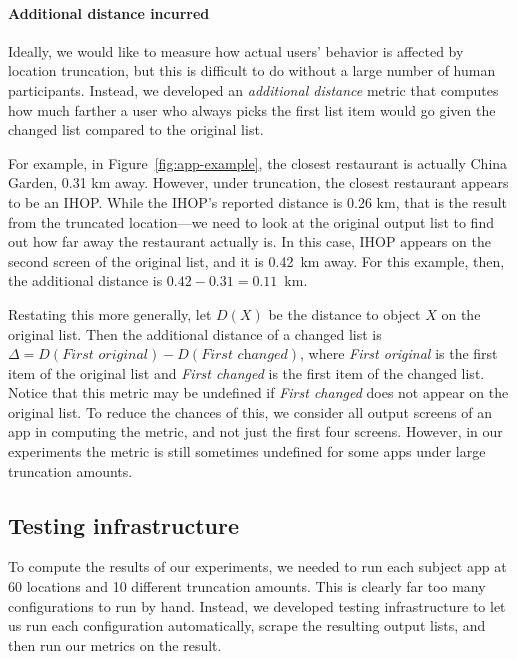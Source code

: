 \documentclass[10pt, conference, compsocconf]{IEEEtran}
\newcommand{\comment}[3][\color{red}]{{#1{[{#2}: {#3}]}}}
\newcommand{\jeff}[1]{\comment[\color{green}]{JSF}{#1}}
\begin{document}
\paragraph*{Additional distance incurred}

Ideally, we would like to measure how actual users' behavior is
affected by location truncation, but this is difficult to do without a large
number of human participants. Instead, we developed an \emph{additional
  distance} metric that computes how much farther a user who always
picks the first list item would go given the changed list compared to
the original list.

For example, in Figure~\ref{fig:app-example}, the closest restaurant
is actually China Garden, 0.31 km away. However, under truncation, the
closest restaurant appears to be an IHOP. While the IHOP's reported
distance is 0.26 km, that is the result from the truncated
location---we need to look at the original output list to find out how
far away the restaurant actually is. In this case, IHOP appears on the
second screen of the original list, and it is 0.42~km
away. For this example, then, the additional distance is $0.42 - 0.31
= 0.11$~km.


Restating this more generally, let $D(X)$ be the distance to object
$X$ on the original list. Then the additional distance of a changed
list is $\Delta = D(\textit{First original}) - D(\textit{First changed})$, where
\textit{First original} is the first item of the original list and
\textit{First changed} is the first item of the changed list. Notice
that this metric may be undefined if \emph{First changed} does not
appear on the original list. To reduce the chances of this, we
consider all output screens of an app in computing the metric, and not
just the first four screens. However, in our experiments the metric is
still sometimes undefined for some apps under large truncation amounts.

\subsection{Testing infrastructure}

To compute the results of our experiments, we needed to run each
subject app at 60 locations and 10 different truncation
amounts. This is clearly far too many configurations to run by
hand. Instead, we developed testing infrastructure to let us run each
configuration automatically, scrape the resulting output lists, and
then run our metrics on the result.
\end{document}
